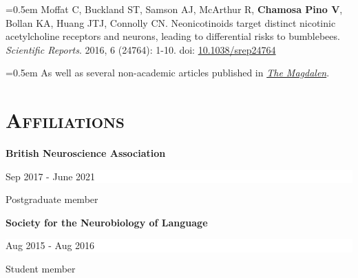 \documentclass[paper=a4,fontsize=11pt]{scrartcl}
\newcommand{\sepspace}{\vspace*{1em}}
\newcommand{\NewPart}[1]{\section*{\textsc{#1}}} %
\newcommand{\AffiliationEntry}[3]{ %
		\noindent \textbf{#1} \hfill %
		\colorbox{White}{
            \parbox{9em}{
			\hfill\color{Black}#2}} \par %
		\noindent #3 \par} %
\begin{document}
\noindent\hangindent=0.5em \small Moffat C, Buckland ST, Samson AJ, McArthur R, \textbf{Chamosa Pino V}, Bollan KA, Huang JTJ, Connolly CN. Neonicotinoids target distinct nicotinic acetylcholine receptors and neurons, leading to differential risks to bumblebees. \textit{Scientific Reports}. 2016, 6 (24764): 1-10. doi: \href{https://www.nature.com/articles/srep24764}{10.1038/srep24764} \par
\sepspace

\noindent\hangindent=0.5em \small As well as several non-academic articles published in \href{https://issuu.com/themagdalen}{\textit{The Magdalen}}.


\NewPart{Affiliations}

\AffiliationEntry{British Neuroscience Association}{Sep 2017 - June 2021}{Postgraduate member}
\sepspace

\AffiliationEntry{Society for the Neurobiology of Language}{Aug 2015 - Aug 2016}{Student member}





\end{document}
